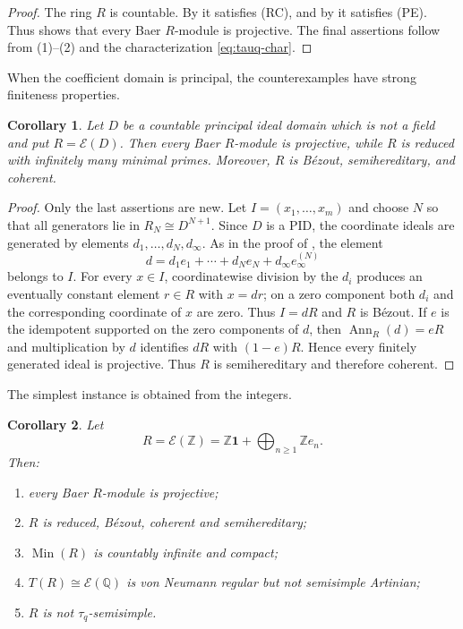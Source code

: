 \documentclass[11pt]{article}
\newtheorem{corollary}[corollary]{Corollary}
\theoremstyle{definition}
\theoremstyle{remark}
\newcommand{\Min}{\operatorname{Min}}
\newcommand{\Ann}{\operatorname{Ann}}
\newcommand{\EC}{\mathcal E}
\begin{document}
\begin{proof}
The ring $R$ is countable.  By  it satisfies (RC), and by
 it satisfies (PE).  Thus  shows that every
Baer $R$-module is projective.  The final assertions follow from
(1)--(2) and the characterization
\eqref{eq:tauq-char}.
\end{proof}

When the coefficient domain is principal, the counterexamples have strong
finiteness properties.

\begin{corollary}\label{cor:PID}
Let $D$ be a countable principal ideal domain which is not a field and put
$R=\EC(D)$.  Then every Baer $R$-module is projective, while $R$ is reduced
with infinitely many minimal primes.  Moreover, $R$ is B\'ezout,
semihereditary, and coherent.
\end{corollary}

\begin{proof}
Only the last assertions are new.  Let $I=(x_1,\ldots,x_m)$ and choose $N$ so
that all generators lie in $R_N\cong D^{N+1}$.  Since $D$ is a PID, the
coordinate ideals are generated by elements
$d_1,\ldots,d_N,d_\infty$.  As in the proof of , the element
\[
 d=d_1e_1+\cdots+d_Ne_N+d_\infty e_\infty^{(N)}
\]
belongs to $I$.  For every $x\in I$, coordinatewise division by the $d_i$
produces an eventually constant element $r\in R$ with $x=dr$; on a zero
component both $d_i$ and the corresponding coordinate of $x$ are zero.  Thus
$I=dR$ and $R$ is B\'ezout.  If $e$ is the idempotent supported on the zero
components of $d$, then $\Ann_R(d)=eR$ and multiplication by $d$ identifies
$dR$ with $(1-e)R$.  Hence every finitely generated ideal is projective.
Thus $R$ is semihereditary and therefore coherent.
\end{proof}

The simplest instance is obtained from the integers.

\begin{corollary}\label{cor:Z}
Let
\[
 R=\EC(\mathbb Z)
 =\mathbb Z\mathbf1+\bigoplus_{n\ge1}\mathbb Ze_n.
\]
Then:
\begin{enumerate}[label=\textup{(\arabic*)}]
\item every Baer $R$-module is projective;
\item $R$ is reduced, B\'ezout, coherent and semihereditary;
\item $\Min(R)$ is countably infinite and compact;
\item $T(R)\cong\EC(\mathbb Q)$ is von Neumann regular but not semisimple
Artinian;
\item $R$ is not $\tau_q$-semisimple.
\end{enumerate}
\end{corollary}
\end{document}

